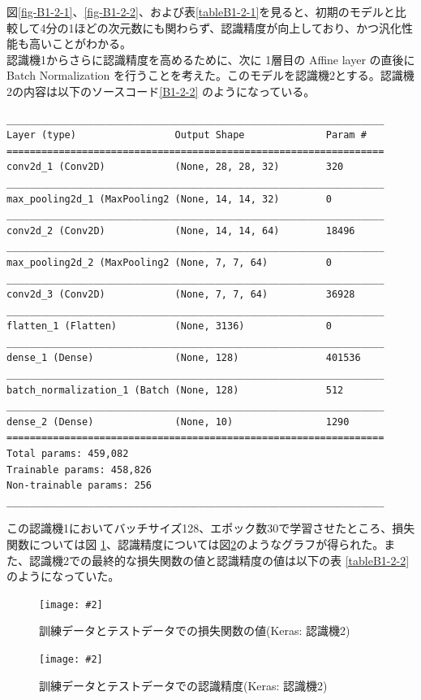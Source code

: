 \documentclass[a4paper,dvipdfmx]{jsarticle}
\newcommand{\image}[3]{
    \begin{figure}[H]
        \begin{center}
        \texttt{[image: \#2]}
        \end{center}
        \caption{#1}
        \label{#3}
    \end{figure}
}
\begin{document}
図\ref{fig-B1-2-1}、\ref{fig-B1-2-2}、および表\ref{tableB1-2-1}を見ると、初期のモデルと比較して4分の1ほどの次元数にも関わらず、認識精度が向上しており、かつ汎化性能も高いことがわかる。\\

認識機1からさらに認識精度を高めるために、次に 1層目の Affine layer の直後に Batch Normalization を行うことを考えた。このモデルを認識機2とする。認識機2の内容は以下のソースコード\ref{B1-2-2} のようになっている。

\begin{lstlisting}[caption="作成した認識機その2",label=B1-2-2]
_________________________________________________________________
Layer (type)                 Output Shape              Param #
=================================================================
conv2d_1 (Conv2D)            (None, 28, 28, 32)        320
_________________________________________________________________
max_pooling2d_1 (MaxPooling2 (None, 14, 14, 32)        0
_________________________________________________________________
conv2d_2 (Conv2D)            (None, 14, 14, 64)        18496
_________________________________________________________________
max_pooling2d_2 (MaxPooling2 (None, 7, 7, 64)          0
_________________________________________________________________
conv2d_3 (Conv2D)            (None, 7, 7, 64)          36928
_________________________________________________________________
flatten_1 (Flatten)          (None, 3136)              0
_________________________________________________________________
dense_1 (Dense)              (None, 128)               401536
_________________________________________________________________
batch_normalization_1 (Batch (None, 128)               512
_________________________________________________________________
dense_2 (Dense)              (None, 10)                1290
=================================================================
Total params: 459,082
Trainable params: 458,826
Non-trainable params: 256
_________________________________________________________________
\end{lstlisting}

この認識機1においてバッチサイズ128、エポック数30で学習させたところ、損失関数については図 \ref{fig-B1-2-3}、認識精度については図\ref{fig-B1-2-4}のようなグラフが得られた。また、認識機2での最終的な損失関数の値と認識精度の値は以下の表 \ref{tableB1-2-2} のようになっていた。

\image{訓練データとテストデータでの損失関数の値(Keras: 認識機2)}{report_b1-2-3.png}{fig-B1-2-3}
\image{訓練データとテストデータでの認識精度(Keras: 認識機2)}{report_b1-2-4.png}{fig-B1-2-4}
\end{document}
